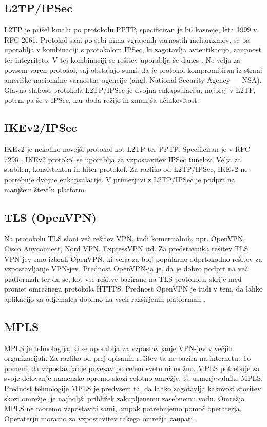 \documentclass[a4paper, 12pt]{book}
\begin{document}
\subsection{L2TP/IPSec}
L2TP je prišel kmalu po protokolu PPTP, specificiran je bil kasneje, leta 1999 v RFC 2661. Protokol sam po sebi nima vgrajenih varnostih mehanizmov, se pa uporablja v kombinaciji s protokolom IPSec, ki zagotavlja avtentikacijo, zaupnost ter integriteto. V tej kombinaciji se rešitev uporablja še danes \cite{valencia_layer_1999}. Ne velja za povsem varen protokol, saj obstajajo sumi, da je protokol kompromitiran iz strani ameriške nacionalne varnostne agencije (angl. National Security Agency --- NSA). 
Glavna slabost protokola L2TP/IPSec je dvojna enkapsulacija, najprej v L2TP, potem pa še v IPSec, kar doda režijo in zmanjša učinkovitost.


\subsection{IKEv2/IPSec}
IKEv2 je nekoliko novejši protokol kot L2TP ter PPTP. Specificiran je v RFC 7296 \cite{kaufman_internet_2014}. IKEv2 protokol se uporablja za vzpostavitev IPSec tunelov. Velja za stabilen, konsistenten in hiter protokol. Za razliko od L2TP/IPSec, IKEv2 ne potrebuje dvojne enkapsulacije. V primerjavi z L2TP/IPSec je podprt na manjšem številu platform.

\subsection{TLS (OpenVPN)}
Na protokolu TLS sloni več rešitev VPN, tudi komercialnih, npr. OpenVPN, Cisco Anyconnect, Nord VPN, ExpressVPN itd. Za predstavnika rešitev TLS VPN-jev smo izbrali OpenVPN, ki velja za bolj popularno odprtokodno rešitev za vzpostavljanje VPN-jev. Prednost OpenVPN-ja je, da je dobro podprt na več platformah ter da se, kot vse rešitve bazirane na TLS protokolu, skrije med promet omrežnega protokola HTTPS. Prednost OpenVPN je tudi v tem, da lahko aplikacijo za odjemalca dobimo na vseh razširjenih platformah \cite{noauthor_business_nodate}. 

\subsection{MPLS}
MPLS je tehnologija, ki se uporablja za vzpostavljanje VPN-jev v večjih organizacijah. Za razliko od prej opisanih rešitev ta ne bazira na internetu. To pomeni, da vzpostavljanje povezav po celem svetu ni možno. MPLS potrebuje za svoje delovanje namensko opremo skozi celotno omrežje, tj. usmerjevalnike MPLS. Prednost tehnologije MPLS je predvsem ta, da lahko zagotavlja kakovost storitev skozi omrežje, je najboljši približek zakupljenemu zasebnemu vodu. Omrežja MPLS ne moremo vzpostaviti sami, ampak potrebujemo pomoč operaterja. Operaterju moramo za vzpostavitev takega omrežja zaupati.
\end{document}
